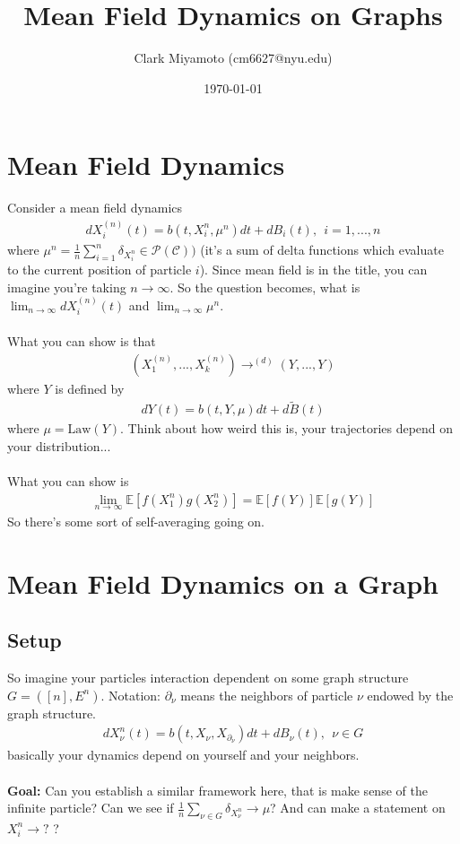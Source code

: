 \documentclass[12pt,fleqn]{article}
\title{Mean Field Dynamics on Graphs}
\author{Clark Miyamoto (cm6627@nyu.edu)}
\date{\today}
\numberwithin{equation}{section} %
\begin{document}
\maketitle
\section{Mean Field Dynamics}
Consider a mean field dynamics
\begin{align}
	dX_i^{(n)}(t) = b(t, X_i^n, \mu^n) dt + dB_i(t), ~~ i = 1,...,n
\end{align}
where $\mu^n = \frac{1}{n} \sum_{i=1}^n \delta_{X_i^{n}} \in \mathcal P(\mathcal C))$ (it's a sum of delta functions which evaluate to the current position of particle $i$). Since mean field is in the title, you can imagine you're taking $n \to \infty$. So the question becomes, what is $\lim_{n \to \infty}  dX_i^{(n)}(t)$ and $\lim_{n \to \infty} \mu^n$.\\
\\
What you can show is that
\begin{align}
	(X_1^{(n)}, ..., X_k^{(n)}) \to^{(d)} (Y, ..., Y)
\end{align}
where $Y$ is defined by
\begin{align}
	dY(t) = b(t,Y, \mu) dt + d\tilde B(t)
\end{align}
where $\mu = \text{Law}(Y)$. Think about how weird this is, your trajectories depend on your distribution...\\
\\
What you can show is
\begin{align}
	\lim_{n \to \infty }\mathbb E[ f(X_1^n ) g(X_2^n)]  = \mathbb E[f(Y) ] \mathbb E[g(Y)]
\end{align}
So there's some sort of self-averaging going on.

\section{Mean Field Dynamics on a Graph}
\subsection{Setup}
So imagine your particles interaction dependent on some graph structure $G = ([n], E^n)$. Notation: $\partial_{\nu}$ means the neighbors of particle $\nu$ endowed by the graph structure.
\begin{align}
	dX_\nu^{n}(t) = b(t, X_\nu, X_{\partial_\nu}) dt + dB_\nu (t), ~~ \nu \in G
\end{align}
basically your dynamics depend on yourself and your neighbors. \\
\\
\textbf{Goal:} Can you establish a similar framework here, that is make sense of the infinite particle? Can we see if $\frac{1}{n} \sum_{\nu \in G} \delta_{X_\nu^n} \to \mu$? And can make a statement on $X_i^n \to ?$ ?
\end{document}
